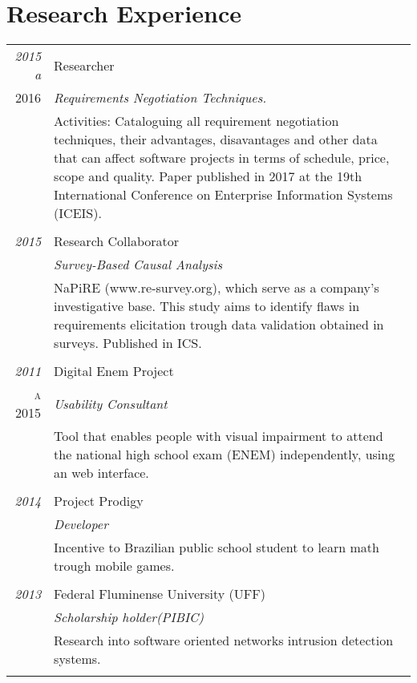 \documentclass[a4paper,10pt]{article}
\begin{document}
 \section{Research Experience}
\begin{tabular}{r|p{11cm}}
 \emph{2015 a} & Researcher \\
 \textsc{2016}&\emph{Requirements Negotiation Techniques.}\\
 &\footnotesize{Activities: Cataloguing all requirement negotiation techniques, their advantages, disavantages and other data that can affect software projects in terms of schedule, price, scope and quality. Paper published in 2017 at the 19th International Conference on Enterprise Information Systems (ICEIS).}\\
 
 & \\
 
 \emph{2015} & Research Collaborator \\
 \textsc{}&\emph{Survey-Based Causal Analysis}\\
 &\footnotesize{NaPiRE (www.re-survey.org), which serve as a company's investigative base. This study aims to identify flaws in requirements elicitation trough data validation obtained in surveys. Published in ICS.}\\
 
 & \\
 
 \emph{2011} & Digital Enem Project \\
 \textsc{a 2015}&\emph{Usability Consultant}\\
 &\footnotesize{Tool that enables people with visual impairment to attend the national high school exam (ENEM) independently, using an web interface.}\\
 
 & \\
 
 \emph{2014} & Project Prodigy \\
 \textsc{}&\emph{Developer}\\
 &\footnotesize{Incentive to Brazilian public school student to learn math trough mobile games.}\\
 
 & \\
 
 \emph{2013} & Federal Fluminense University (UFF) \\
 \textsc{}&\emph{Scholarship holder(PIBIC)}\\
 &\footnotesize{Research into software oriented networks intrusion detection systems.}\\
 
 \multicolumn{2}{c}{} \end{tabular}
\end{document}
